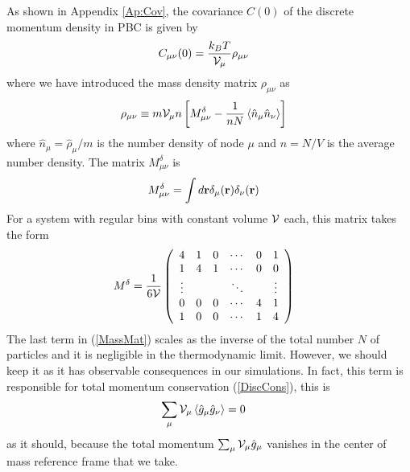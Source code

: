 \documentclass[b5paper,openright,11pt]{book}
\newcommand{\Pendiente}[1]{{\color{green}#1}} %
\newcommand{\llangle}{\left\langle}
\newcommand{\rrangle}{\right\rangle}
\begin{document}
\Pendiente{As  shown  in Appendix  \ref{Ap:Cov},  the  covariance $C(0)$  of  the
discrete momentum density in PBC is given by
\begin{align}
C_{\mu\nu}(0)&= \frac{k_BT}{{\cal V}_\mu} \rho_{\mu\nu}
\label{gg}
\end{align}
where we have introduced the mass density matrix $\rho_{\mu\nu}$ as
\begin{align}
  \rho_{\mu\nu}&\equiv  m{\cal V}_\mu n \left[ M^\delta_{\mu\nu}-
\frac{1}{n N}  \llangle \hat{n}_\mu\hat{n}_\nu\rrangle\right]
\label{MassMat}
\end{align}
where  $\hat{n}_\mu=\hat{\rho}_\mu/m$ is  the number  density  of node $\mu$ and $n=N/V$  is the  average
number density.  The
matrix $M^\delta_{\mu\nu}$ is
\begin{align}
  M^\delta_{\mu\nu}&=\int d{\bf r}\delta_\mu({\bf r})\delta_\nu({\bf r}) 
\end{align}
For a system  with regular bins with constant volume  ${\cal V}$ each,
this matrix takes the form
\begin{align}
{M}^\delta&=\frac{1}{6{\cal V}}
\left(\begin{array}{cccccc}
4&1&0&\cdots &0&1\\
1&4&1&\cdots &0&0\\
\vdots&&&\ddots&&\vdots\\
0&0&0&\cdots &4&1\\
1&0&0&\cdots&1&4
\end{array}\right)
\end{align}
The last  term in (\ref{MassMat}) scales  as the inverse of  the total
number  $N$ of  particles and  it is  negligible in  the thermodynamic
limit.  However, we  should keep it as it  has observable consequences
in  our simulations.   In fact,  this  term is  responsible for  total
momentum conservation (\ref{DiscCons}), this is
\begin{align}
  \sum_\mu{\cal V}_\mu\llangle \hat{g}_\mu\hat{g}_\nu\rrangle &=0
\end{align}
as   it   should,   because    the   total   momentum   $\sum_\mu{\cal
  V}_\mu\hat{g}_\mu$ vanishes  in the  center of mass  reference frame
that we take.
} %
\end{document}
